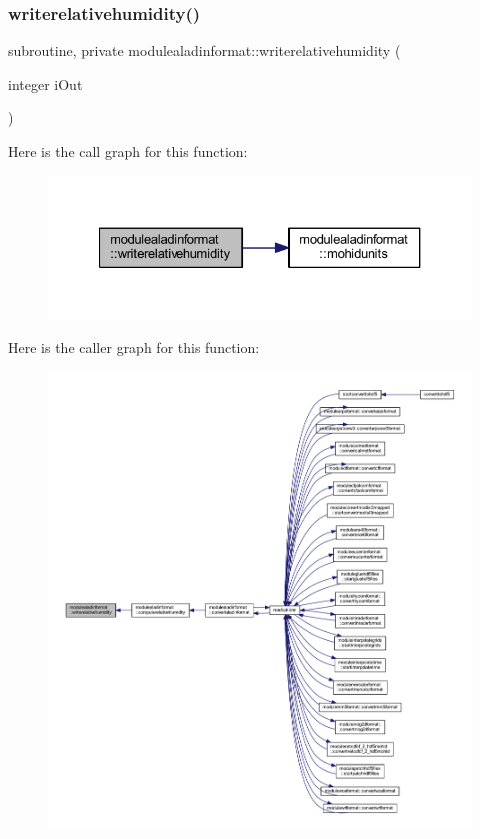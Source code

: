 \subsubsection{\texorpdfstring{writerelativehumidity()}{writerelativehumidity()}}
{\footnotesize\ttfamily subroutine, private modulealadinformat\+::writerelativehumidity (\begin{DoxyParamCaption}\item[{integer}]{i\+Out }\end{DoxyParamCaption})\hspace{0.3cm}{\ttfamily [private]}}

Here is the call graph for this function\+:\nopagebreak
\begin{figure}[H]
\begin{center}
\leavevmode
\includegraphics[width=327pt]{namespacemodulealadinformat_a2c5da57a26426886fbd2f4fbe4ce299c_cgraph}
\end{center}
\end{figure}
Here is the caller graph for this function\+:\nopagebreak
\begin{figure}[H]
\begin{center}
\leavevmode
\includegraphics[width=350pt]{namespacemodulealadinformat_a2c5da57a26426886fbd2f4fbe4ce299c_icgraph}
\end{center}
\end{figure}


